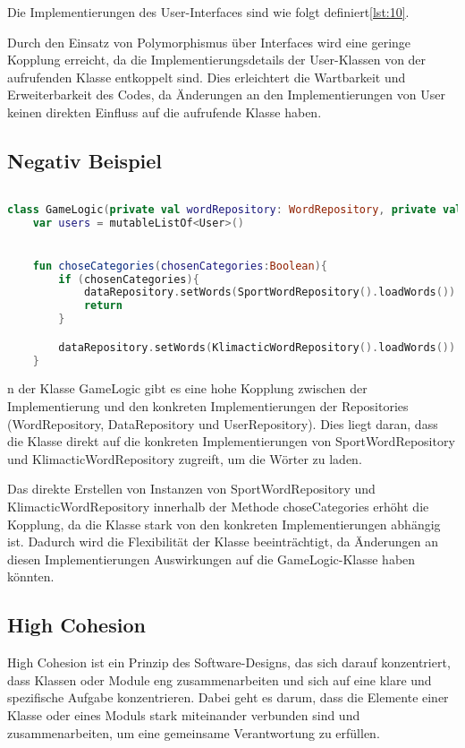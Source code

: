 Die Implementierungen des User-Interfaces sind wie folgt definiert\ref{lst:10}.

Durch den Einsatz von Polymorphismus über Interfaces wird eine geringe Kopplung erreicht, da die Implementierungsdetails der User-Klassen von der aufrufenden Klasse entkoppelt sind. Dies erleichtert die Wartbarkeit und Erweiterbarkeit des Codes, da Änderungen an den Implementierungen von User keinen direkten Einfluss auf die aufrufende Klasse haben.

\subsection*{Negativ Beispiel}
\begin{lstlisting}[language=Kotlin, caption={Abhängigkeit von direkter Implementierung}, label={lst:9}]
    
class GameLogic(private val wordRepository: WordRepository, private val dataRepository: DataRepository, private val userRepository: UserRepository) {
    var users = mutableListOf<User>()


    fun choseCategories(chosenCategories:Boolean){
        if (chosenCategories){
            dataRepository.setWords(SportWordRepository().loadWords())
            return
        }

        dataRepository.setWords(KlimacticWordRepository().loadWords())
    }
\end{lstlisting}

n der Klasse GameLogic gibt es eine hohe Kopplung zwischen der Implementierung und den konkreten Implementierungen der Repositories (WordRepository, DataRepository und UserRepository). Dies liegt daran, dass die Klasse direkt auf die konkreten Implementierungen von SportWordRepository und KlimacticWordRepository zugreift, um die Wörter zu laden.

Das direkte Erstellen von Instanzen von SportWordRepository und KlimacticWordRepository innerhalb der Methode choseCategories erhöht die Kopplung, da die Klasse stark von den konkreten Implementierungen abhängig ist. Dadurch wird die Flexibilität der Klasse beeinträchtigt, da Änderungen an diesen Implementierungen Auswirkungen auf die GameLogic-Klasse haben könnten.

\subsection{High Cohesion}




High Cohesion ist ein Prinzip des Software-Designs, das sich darauf konzentriert, dass Klassen oder Module eng zusammenarbeiten und sich auf eine klare und spezifische Aufgabe konzentrieren. Dabei geht es darum, dass die Elemente einer Klasse oder eines Moduls stark miteinander verbunden sind und zusammenarbeiten, um eine gemeinsame Verantwortung zu erfüllen.

